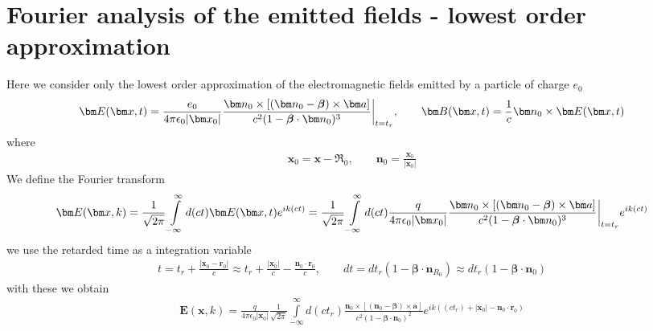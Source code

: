 

\section{Fourier analysis of the emitted fields - lowest order approximation}

Here we consider only the lowest order approximation of the electromagnetic fields emitted by a particle of charge $e_0$
\begin{align}
    {\bm E}({\bm x},t)={\frac{e_0}{4\pi\epsilon_0|{\bm x}_0|}\frac{{\bm n}_{0}\times[({\bm n}_{0}-{\boldsymbol\beta})\times {\bm a}]}{c^2(1-{\boldsymbol\beta}\cdot{\bm n}_{0})^3}\,\vline}_{\,t=t_r},\qquad {\bm B}({\bm x},t) = \frac1c{\bm n}_0\times{\bm E}({\bm x},t)
\end{align}
where
\begin{align}
    {\bm x}_0={\bm x}-{\boldsymbol{\mathfrak{R}}}_0,\qquad {\bm n}_0=\frac{{\bm x}_0}{|{\bm x}_0|}
\end{align}
We define the Fourier transform
\begin{align}
    {\bm E}({\bm x},k) = \frac1{\sqrt{2\pi}}\int\limits_{-\infty}^{\infty} d (ct) {\bm E}({\bm x},t)e^{ik  (ct)}=\frac1{\sqrt{2\pi}}\int\limits_{-\infty}^{\infty} d (ct) {\frac{q}{4\pi\epsilon_0|{\bm x}_0|}\frac{{\bm n}_{0}\times[({\bm n}_{0}-{\boldsymbol\beta})\times {\bm a}]}{c^2(1-{\boldsymbol\beta}\cdot{\bm n}_{0})^3}\,\vline}_{\,t=t_r}e^{ik(ct)}
\end{align}
we use the retarded time as a integration variable
\begin{align}
    t=t_r+\frac{|{\bm x}_0-{\bm r}_0|}c\approx t_r+\frac{|{\bm x}_0|}c-\frac{{\bm n}_0\cdot{\bm r}_0}c,\qquad dt=dt_r(1-{\boldsymbol{\beta}}\cdot{\bm n}_{R_0})\approx dt_r(1-{\boldsymbol{\beta}}\cdot{\bm n}_0)
\end{align}
with these we obtain
\begin{align}
    {\bm E}({\bm x},k) = \frac{q}{4\pi\epsilon_0|{\bm x}_0|}\frac1{\sqrt{2\pi}}\int\limits_{-\infty}^{\infty}d(ct_r) \frac{{\bm n}_{0}\times[({\bm n}_{0}-{\boldsymbol\beta})\times {\bm a}]}{c^2(1-{\boldsymbol\beta}\cdot{\bm n}_{0})^2}e^{ik((ct_r)+|{\bm x}_0|-{\bm n}_0\cdot{\bm r}_0)}
\end{align}


